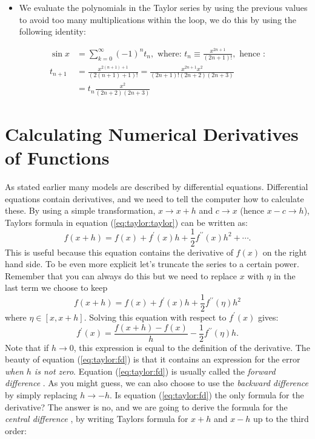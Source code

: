 \documentclass[graybox,sectrefs,envcountresetchap,open=right,final]{svmonodo}
\newenvironment{graybox2admon}[1][]{
\begin{graybox2mdframed}[frametitle=#1]
}
{
\end{graybox2mdframed}
}
\begin{document}
\begin{graybox2admon}[Example: evaluate $\sin x$]
\begin{itemize}
\item We evaluate the polynomials in the Taylor series by using the previous values to avoid too many multiplications within the loop, we do this by using the following identity:
\end{itemize}

\noindent
  \begin{align}
  \sin x&=\sum_{k=0}^{\infty} (-1)^nt_n, \text{ where: } t_n\equiv\frac{x^{2n+1}}{(2n+1)!}, \text{ hence :}\nonumber\\ 
  t_{n+1}&=\frac{x^{2(n+1)+1}}{(2(n+1)+1)!}=\frac{x^{2n+1}x^2}{(2n+1)! (2n+2)(2n+3)}\nonumber\\ 
  &=t_n\frac{x^2}{(2n+2)(2n+3)}
  \end{align}
\end{graybox2admon}




\section{Calculating Numerical Derivatives of Functions}

As stated earlier many models are described by differential equations. Differential equations contain derivatives, and we need to tell the computer how to calculate these. By using a simple transformation, $x\to x+h$ and $c\to x$ (hence $x-c\to h$), Taylors formula in equation (\ref{eq:taylor:taylor}) can be written as:
\begin{equation}
f(x+h)=f(x)+f^\prime(x)h+\frac{1}{2}f^{\prime\prime}(x)h^2+\cdots.
\label{eq:taylor:t}
\end{equation}
This is useful because this equation contains the derivative of $f(x)$ on the right hand side. To be even more explicit let's truncate the series to a certain power. Remember that you can always do this but we need to replace $x$ with $\eta$ in the last term we choose to keep
\begin{equation}
f(x+h)=f(x)+f^\prime(x)h+\frac{1}{2}f^{\prime\prime}(\eta)h^2
\label{eq:taylor:t3}
\end{equation}
where $\eta\in[x,x+h]$. Solving this equation with respect to $f^\prime(x)$ gives:
\begin{equation}
f^\prime(x)=\frac{f(x+h)-f(x)}{h}-\frac{1}{2}f^{\prime\prime}(\eta)h.
\label{eq:taylor:fd}
\end{equation}
Note that if $h\to0$, this expression is equal to the definition of the derivative. The beauty of equation (\ref{eq:taylor:fd}) is that it contains an expression for the error \emph{when $h$ is not zero}. Equation (\ref{eq:taylor:fd}) is usually called the \emph{forward difference} . As you might guess, we can also choose to use the \emph{backward difference}  by simply replacing $h\to-h$. Is equation (\ref{eq:taylor:fd}) the only formula for the derivative? The answer is no, and we are going to derive the formula for the \emph{central difference} , by writing Taylors formula for $x+h$ and $x-h$ up to the third order:
\end{document}
